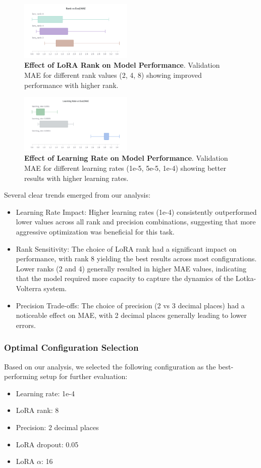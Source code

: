 \documentclass{article}
\begin{document}
\begin{figure}[h]
    \centering
    \includegraphics[width=0.48\textwidth]{rank}
    \caption{\textbf{Effect of LoRA Rank on Model Performance}. Validation MAE for different rank values (2, 4, 8) showing improved performance with higher rank.}
    \label{fig:hp_rank}
\end{figure}

\begin{figure}[h]
    \centering
    \includegraphics[width=0.48\textwidth]{learningrate}
    \caption{\textbf{Effect of Learning Rate on Model Performance}. Validation MAE for different learning rates (1e-5, 5e-5, 1e-4) showing better results with higher learning rates.}
    \label{fig:hp_learningrate}
\end{figure}
Several clear trends emerged from our analysis:
\begin{itemize}
    \item Learning Rate Impact: Higher learning rates (1e-4) consistently outperformed lower values across all rank and precision combinations, suggesting that more aggressive optimization was beneficial for this task.
    \item Rank Sensitivity: The choice of LoRA rank had a significant impact on performance, with rank 8 yielding the best results across most configurations. Lower ranks (2 and 4) generally resulted in higher MAE values, indicating that the model required more capacity to capture the dynamics of the Lotka-Volterra system.
    \item Precision Trade-offs: The choice of precision (2 vs 3 decimal places) had a noticeable effect on MAE, with 2 decimal places generally leading to lower errors. 
\end{itemize}


\subsubsection*{Optimal Configuration Selection}
Based on our analysis, we selected the following configuration as the best-performing setup for further evaluation:
\begin{itemize}
    \item Learning rate: 1e-4
    \item LoRA rank: 8
    \item Precision: 2 decimal places
    \item LoRA dropout: 0.05
    \item LoRA $\alpha$: 16
\end{itemize}
\end{document}
